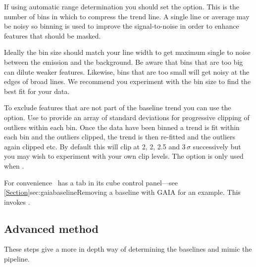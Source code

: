 \documentclass[11pt,oneside,chapters]{starlink}
\providecommand{\mfittrend}{\xref{\task{mfittrend}}{sun95}{MFITTREND}}
\begin{document}
\begin{terminalv}
\end{terminalv}

If using automatic range determination you should set the
 option. This is the number of bins in which to compress
the trend line. A single line or average may be noisy so binning is
used to improve the signal-to-noise in order to enhance features that
should be masked.

Ideally the bin size should match your line width to get maximum
single to noise between the emission and the background. Be aware that
bins that are too big can dilute weaker features. Likewise, bins that
are too small will get noisy at the edges of broad lines. We recommend
you experiment with the bin size to find the best fit for your data.

To exclude features that are not part of the baseline trend you can
use the  option. Use  to provide an array of
standard deviations for progressive clipping of outliers within each
bin. Once the data have been binned a trend is fit within each bin and
the outliers clipped, the trend is then re-fitted and the outliers
again clipped etc. By default this will clip at 2, 2, 2.5 and
3\,$\sigma$ successively but you may wish to experiment with your own
clip levels. The  option is only used when
.

For convenience \gaia\ has a  tab in its cube
control panel---see \cref{Section}{sec:gaiabaseline}{Removing a
baseline with GAIA} for an example.  This invokes \mfittrend.


\subsection{Advanced method}
These steps give a more in depth way of determining the baselines and
mimic the pipeline.
\end{document}
